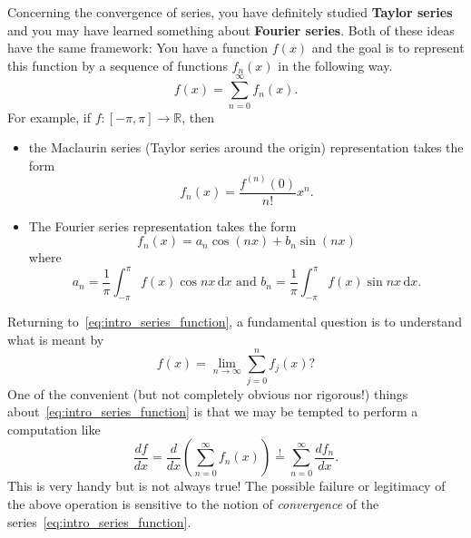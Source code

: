 \documentclass[12pt]{book}
\newcommand{\R}{\mathbb{R}}
\theoremstyle{remark}
\theoremstyle{definition}
\begin{document}
	Concerning the convergence of series, you have definitely studied \textbf{Taylor series} and you may have learned something about \textbf{Fourier series}. Both of these ideas have the same framework: You have a function $f(x)$ and the goal is to represent this function by a sequence of functions $f_n(x)$ in the following way.
	\begin{equation}
		\label{eq:intro_series_function}
	f(x) = \sum_{n=0}^\infty f_n(x).
	\end{equation}
	For example, if $f:[-\pi,\pi]\to \R$, then
	\begin{itemize}
		\item the Maclaurin series (Taylor series around the origin) representation takes the form
		\[
		f_n(x) = \frac{f^{(n)}(0)}{n!}x^n.
		\]
		\item The Fourier series representation takes the form
		\[
		f_n(x) = a_n \cos (nx) + b_n \sin (nx)
		\]
		where
		\[
		a_n = \frac{1}{\pi}\int_{-\pi}^\pi f(x) \cos nx \,\mathrm{d}x\text{ and }b_n = \frac{1}{\pi}\int_{-\pi}^\pi f(x) \sin nx\,\mathrm{d}x.
		\]
	\end{itemize}
	Returning to~\eqref{eq:intro_series_function}, a fundamental question is to understand what is meant by
	\[
	f(x) = \lim_{n\to \infty}\sum_{j=0}^nf_j(x)?
	\]
	One of the convenient (but not completely obvious nor rigorous!) things about~\eqref{eq:intro_series_function} is that we may be tempted to perform a computation like
	\[
	\frac{df}{dx} = \frac{d}{dx}\left(\sum_{n=0}^\infty f_n(x)\right) \overset{!}{=}\sum_{n=0}^\infty \frac{df_n}{dx}.
	\]
	This is very handy but is not always true! The possible failure or legitimacy of the above operation is sensitive to the notion of \textit{convergence} of the series~\eqref{eq:intro_series_function}.
	
\end{document}

